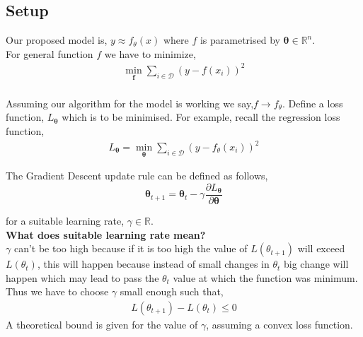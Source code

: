 \documentclass[11pt, twosides]{article}
\begin{document}
\subsection{Setup}
Our proposed model is, $y \approx f_{\theta}(x)$ where $f$ is parametrised by $\mathbf{\theta} \in \mathbb{R}^{n}$. \\
For general function $f$ we have to minimize,\\
\begin{align*}
    \min_{\mathbf{f}}\sum_{i \in\mathcal{D}} (y-f(x_{i}))^2
\end{align*}\\
Assuming our algorithm for the model is working we say,$f \to f_{\theta}$.
Define a loss function, $L_{\mathbf{\theta}}$ which is to be minimised. For example, recall the regression loss function,\\
\begin{align*}
    L_{\mathbf{\theta}} = \min_{\mathbf{\theta}}\sum_{i \in\mathcal{D}} (y-f_{\theta}(x_{i}))^2
\end{align*}


The Gradient Descent update rule can be defined as follows, 
\begin{equation}
    \mathbf{\theta}_{t + 1} = \mathbf{\theta}_{t} - \gamma\frac{{\partial}L_{\mathbf{\theta}}}{{\partial}\mathbf{\theta}}
\end{equation}

for a suitable learning rate, $\gamma \in \mathbb{R}$.\\
\textbf{What does suitable learning rate mean?}\\
$\gamma$ can't be too high because if it is too high the value of $L(\theta_{t+1})$ will exceed $L(\theta_{t})$, this will happen because instead of small changes in $\theta_{t}$ big change will happen which may lead to pass the $\theta_{t}$ value at which the function was minimum.\\
Thus we have to choose $\gamma$ small enough such that,
\begin{align*}
    L(\theta_{t+1}) - L(\theta_t) \leq 0
\end{align*}
 A theoretical bound is given for the value of $\gamma$, assuming a convex loss function.
\end{document}
